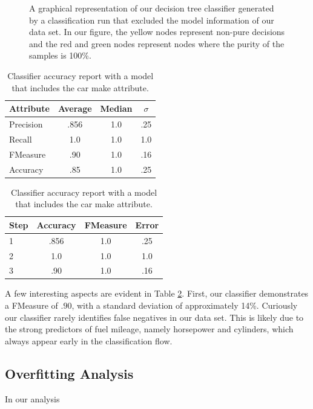 \documentclass[letterpaper,12pt]{article}
\begin{document}
\begin{figure}[H]
  \caption{A graphical representation of our decision tree classifier generated by a classification run that excluded the model information of our data set. In our figure, the yellow nodes represent non-pure decisions and the red and green nodes represent nodes where the purity of the samples is 100\%.}
  \label{fig:tree}
\end{figure}



\begin{table}[H]
  \centering
\begin{tabular}{ | l | c | c | c |}
  \hline
  Attribute &  Average & Median & $\sigma$ \\
  \hline
  Precision & .856 & 1.0 & .25 \\
  \hline
  Recall    & 1.0 & 1.0 & 1.0 \\
  \hline
  FMeasure  & .90 & 1.0 & .16 \\
  \hline
  Accuracy  & .85 & 1.0 & .25 \\
  \hline

\end{tabular}
\caption{Classifier accuracy report with a model that includes the car make attribute.}
\label{table:with-model}
\end{table}



\begin{table}[H]
  \centering
\begin{tabular}{ | l | c | c | c |}
  \hline
  Step & Accuracy & FMeasure & Error \\
  \hline
  1 & .856 & 1.0 & .25 \\
  \hline
  2    & 1.0 & 1.0 & 1.0 \\
  \hline
  3  & .90 & 1.0 & .16 \\
  \hline
\end{tabular}
\caption{Classifier accuracy report with a model that includes the car make attribute.}
\label{table:with-model}
\end{table}


A few interesting aspects are evident in Table \ref{table:with-model}. First, our classifier demonstrates a FMeasure of $.90$, with a standard deviation of approximately 14\%. Curiously our classifier rarely identifies false negatives in our data set. This is likely due to the strong predictors of fuel mileage, namely horsepower and cylinders, which always appear early in the classification flow.

\subsection{Overfitting Analysis}

In our analysis



\end{document}
